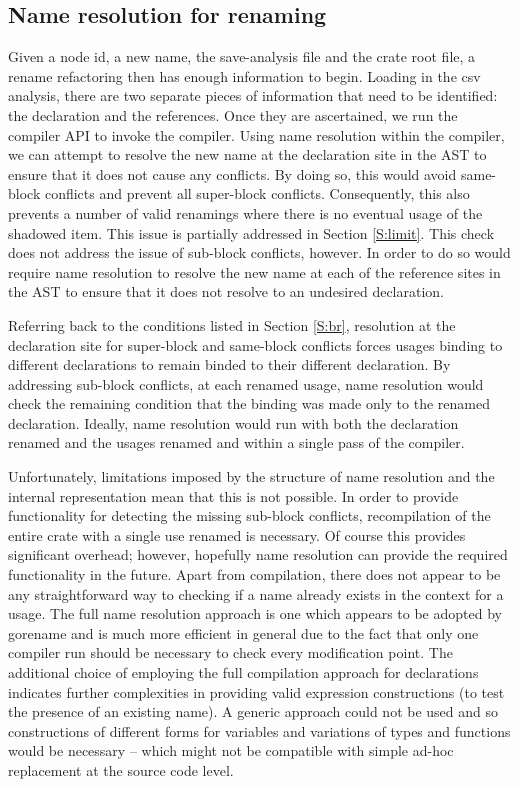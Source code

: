 \subsection{Name resolution for renaming}
Given a node id, a new name, the save-analysis file and the crate root file, a rename refactoring then has enough information to begin. Loading in the csv analysis, there are two separate pieces of information that need to be identified: the declaration and the references. Once they are ascertained, we run the compiler API to invoke the compiler. Using name resolution within the compiler, we can attempt to resolve the new name at the declaration site in the AST to ensure that it does not cause any conflicts. By doing so, this would avoid same-block conflicts and prevent all super-block conflicts. Consequently, this also prevents a number of valid renamings where there is no eventual usage of the shadowed item. This issue is partially addressed in Section \ref{S:limit}. This check does not address the issue of sub-block conflicts, however. In order to do so would require name resolution to resolve the new name at each of the reference sites in the AST to ensure that it does not resolve to an undesired declaration. 

Referring back to the conditions listed in Section \ref{S:br}, resolution at the declaration site for super-block and same-block conflicts forces usages binding to different declarations to remain binded to their different declaration. By addressing sub-block conflicts, at each renamed usage, name resolution would check the remaining condition that the binding was made only to the renamed declaration. Ideally, name resolution would run with both the declaration renamed and the usages renamed and within a single pass of the compiler.

Unfortunately, limitations imposed by the structure of name resolution and the internal representation mean that this is not possible. In order to provide functionality for detecting the missing sub-block conflicts, recompilation of the entire crate with a single use renamed is necessary. Of course this provides significant overhead; however, hopefully name resolution can provide the required functionality in the future. Apart from compilation, there does not appear to be any straightforward way to checking if a name already exists in the context for a usage. The full name resolution approach is one which appears to be adopted by gorename \cite{gorename15} and is much more efficient in general due to the fact that only one compiler run should be necessary to check every modification point. The additional choice of employing the full compilation approach for declarations indicates further complexities in providing valid expression constructions (to test the presence of an existing name). A generic approach could not be used and so constructions of different forms for variables and variations of types and functions would be necessary -- which might not be compatible with simple ad-hoc replacement at the source code level.


